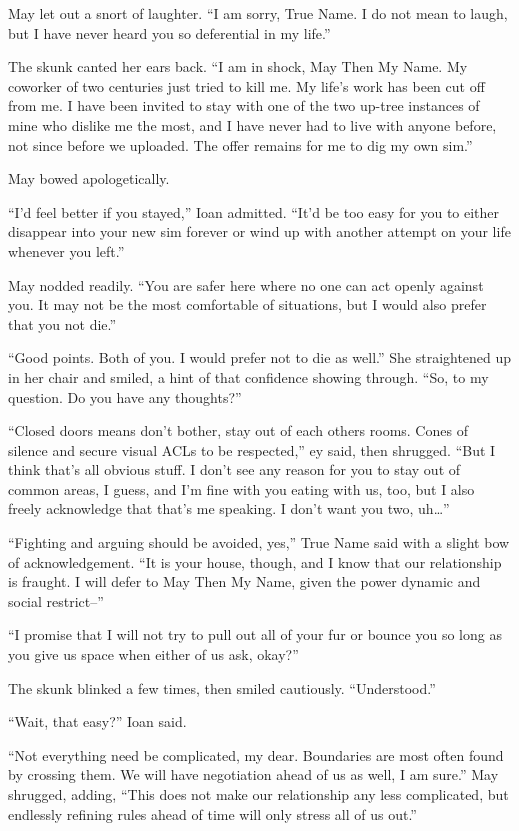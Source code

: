 May let out a snort of laughter. ``I am sorry, True Name. I do not mean to laugh, but I have never heard you so deferential in my life.''

The skunk canted her ears back. ``I am in shock, May Then My Name. My coworker of two centuries just tried to kill me. My life's work has been cut off from me. I have been invited to stay with one of the two up-tree instances of mine who dislike me the most, and I have never had to live with anyone before, not since before we uploaded. The offer remains for me to dig my own sim.''

May bowed apologetically.

``I'd feel better if you stayed,'' Ioan admitted. ``It'd be too easy for you to either disappear into your new sim forever or wind up with another attempt on your life whenever you left.''

May nodded readily. ``You are safer here where no one can act openly against you. It may not be the most comfortable of situations, but I would also prefer that you not die.''

``Good points. Both of you. I would prefer not to die as well.'' She straightened up in her chair and smiled, a hint of that confidence showing through. ``So, to my question. Do you have any thoughts?''

``Closed doors means don't bother, stay out of each others rooms. Cones of silence and secure visual ACLs to be respected,'' ey said, then shrugged. ``But I think that's all obvious stuff. I don't see any reason for you to stay out of common areas, I guess, and I'm fine with you eating with us, too, but I also freely acknowledge that that's me speaking. I don't want you two, uh\ldots{}''

``Fighting and arguing should be avoided, yes,'' True Name said with a slight bow of acknowledgement. ``It is your house, though, and I know that our relationship is fraught. I will defer to May Then My Name, given the power dynamic and social restrict--''

``I promise that I will not try to pull out all of your fur or bounce you so long as you give us space when either of us ask, okay?''

The skunk blinked a few times, then smiled cautiously. ``Understood.''

``Wait, that easy?'' Ioan said.

``Not everything need be complicated, my dear. Boundaries are most often found by crossing them. We will have negotiation ahead of us as well, I am sure.'' May shrugged, adding, ``This does not make our relationship any less complicated, but endlessly refining rules ahead of time will only stress all of us out.''

